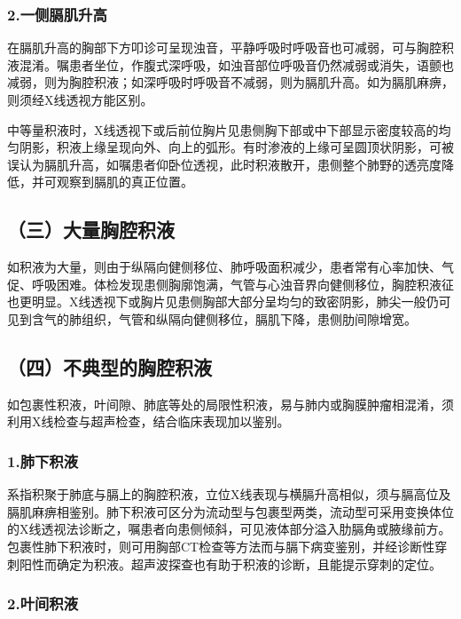\subsubsection{2.一侧膈肌升高}

在膈肌升高的胸部下方叩诊可呈现浊音，平静呼吸时呼吸音也可减弱，可与胸腔积液混淆。嘱患者坐位，作腹式深呼吸，如浊音部位呼吸音仍然减弱或消失，语颤也减弱，则为胸腔积液；如深呼吸时呼吸音不减弱，则为膈肌升高。如为膈肌麻痹，则须经X线透视方能区别。

中等量积液时，X线透视下或后前位胸片见患侧胸下部或中下部显示密度较高的均匀阴影，积液上缘呈现向外、向上的弧形。有时渗液的上缘可呈圆顶状阴影，可被误认为膈肌升高，如嘱患者仰卧位透视，此时积液散开，患侧整个肺野的透亮度降低，并可观察到膈肌的真正位置。

\subsection{（三）大量胸腔积液}

如积液为大量，则由于纵隔向健侧移位、肺呼吸面积减少，患者常有心率加快、气促、呼吸困难。体检发现患侧胸廓饱满，气管与心浊音界向健侧移位，胸腔积液征也更明显。X线透视下或胸片见患侧胸部大部分呈均匀的致密阴影，肺尖一般仍可见到含气的肺组织，气管和纵隔向健侧移位，膈肌下降，患侧肋间隙增宽。

\subsection{（四）不典型的胸腔积液}

如包裹性积液，叶间隙、肺底等处的局限性积液，易与肺内或胸膜肿瘤相混淆，须利用X线检查与超声检查，结合临床表现加以鉴别。

\subsubsection{1.肺下积液}

系指积聚于肺底与膈上的胸腔积液，立位X线表现与横膈升高相似，须与膈高位及膈肌麻痹相鉴别。肺下积液可区分为流动型与包裹型两类，流动型可采用变换体位的X线透视法诊断之，嘱患者向患侧倾斜，可见液体部分溢入肋膈角或腋缘前方。包裹性肺下积液时，则可用胸部CT检查等方法而与膈下病变鉴别，并经诊断性穿刺阳性而确定为积液。超声波探查也有助于积液的诊断，且能提示穿刺的定位。

\subsubsection{2.叶间积液}

